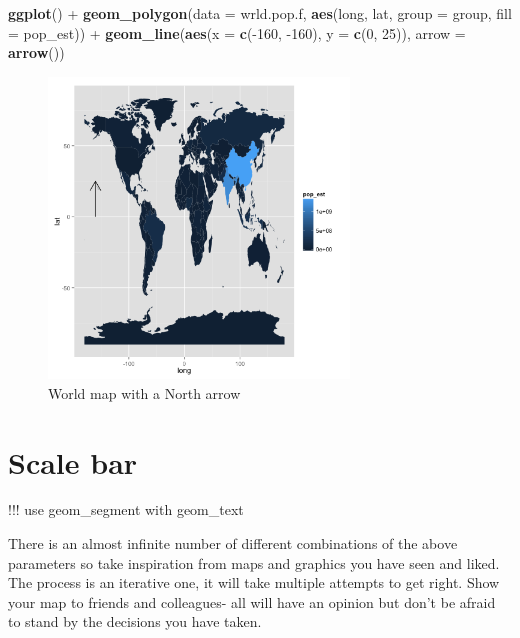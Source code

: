 \documentclass[]{article}
\newenvironment{Shaded}{}{}
\newcommand{\KeywordTok}[1]{\textcolor[rgb]{0.00,0.44,0.13}{\textbf{{#1}}}}
\newcommand{\DataTypeTok}[1]{\textcolor[rgb]{0.56,0.13,0.00}{{#1}}}
\newcommand{\DecValTok}[1]{\textcolor[rgb]{0.25,0.63,0.44}{{#1}}}
\newcommand{\NormalTok}[1]{{#1}}
\let\Oldincludegraphics\includegraphics
\renewcommand{\includegraphics}[1]{\Oldincludegraphics[width=8cm]{#1}}
\begin{document}
\begin{Shaded}
\begin{Highlighting}[]
\KeywordTok{ggplot}\NormalTok{() + }\KeywordTok{geom_polygon}\NormalTok{(}\DataTypeTok{data =} \NormalTok{wrld.pop.f, }\KeywordTok{aes}\NormalTok{(long, lat, }\DataTypeTok{group =} \NormalTok{group, }\DataTypeTok{fill =} \NormalTok{pop_est)) + }
    \KeywordTok{geom_line}\NormalTok{(}\KeywordTok{aes}\NormalTok{(}\DataTypeTok{x =} \KeywordTok{c}\NormalTok{(-}\DecValTok{160}\NormalTok{, -}\DecValTok{160}\NormalTok{), }\DataTypeTok{y =} \KeywordTok{c}\NormalTok{(}\DecValTok{0}\NormalTok{, }\DecValTok{25}\NormalTok{)), }\DataTypeTok{arrow =} \KeywordTok{arrow}\NormalTok{())}
\end{Highlighting}
\end{Shaded}
\begin{figure}[htbp]
\centering
\includegraphics{figure/World_map_with_a_North_arrow.png}
\caption{World map with a North arrow}
\end{figure}

\section{Scale bar}

!!! use geom\_segment with geom\_text

There is an almost infinite number of different combinations of the
above parameters so take inspiration from maps and graphics you have
seen and liked. The process is an iterative one, it will take multiple
attempts to get right. Show your map to friends and colleagues- all will
have an opinion but don't be afraid to stand by the decisions you have
taken.
\end{document}
